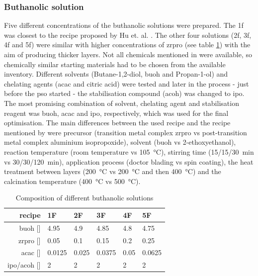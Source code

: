 \subsubsection{Buthanolic solution}\label{sec:exp-sol-bu}
Five different concentrations of the buthanolic solutions were prepared. 
The \gls{1f} was closest to the recipe proposed by Hu et. al. \cite{Hu2016}. 
The other four solutions (\gls{2f}, \gls{3f}, \gls{4f} and \gls{5f}) were similar with 
higher concentrations of \gls{zrpro} (see table \ref{tab:rec2})
with the aim of producing thicker layers.
Not all chemicals mentioned in \cite{Hu2016} were available, so chemically similar 
starting materials had to be chosen from the available inventory. 
Different solvents (Butane-1,2-diol, \gls{buoh} and Propan-1-ol) and chelating agents 
(\gls{acac} and citric acid) were tested and later in the process - just before the 
\gls{pso} started - the stabilisation compound (\gls{acoh}) was changed to \gls{ipo}.
The most promising combination of solvent, chelating agent and stabilisation reagent was 
\gls{buoh}, \gls{acac} and \gls{ipo}, respectively, which was used for the final optimisation.
The main differences between the used recipe and the recipe mentioned by \cite{Hu2016} were 
precursor (transition metal complex \gls{zrpro}	\gls{vs} post-transition metal 
complex aluminium isopropoxide), solvent (\gls{buoh} \gls{vs} 2-ethoxyethanol), reaction temperature 
(room temperature \gls{vs} \SI{105}{\celsius}), stirring time (15/15/\SI{30}{\minute}
\gls{vs} 30/30/\SI{120}{\minute}), application process (doctor blading \gls{vs} spin coating), 
the heat treatment between layers (\SI{200}{\celsius} \gls{vs} \SI{200}{\celsius} and then \SI{400}
{\celsius}) and the calcination temperature (\SI{400}{\celsius} \gls{vs}
\SI{500}{\celsius}).

\begin{table}[h]
	\centering
	\caption{Composition of different buthanolic solutions}
	\label{tab:rec2}
	\begin{tabular}{rlllll}
		\hline
		recipe	&1F		&2F		&3F		&4F		&5F		\\
		\hline
		\gls{buoh} [\ml{}]		&4.95	&4.9	&4.85	&4.8	&4.75	\\
		\gls{zrpro} [\ml{}]	&0.05	&0.1	&0.15	&0.2	&0.25	\\
		\gls{acac} [\ml{}]		&0.0125	&0.025	&0.0375	&0.05	&0.0625	\\
		\gls{ipo}/\gls{acoh} [\ml{}]		&2		&2		&2		&2		&2		\\
		\hline
	\end{tabular}
\end{table}

